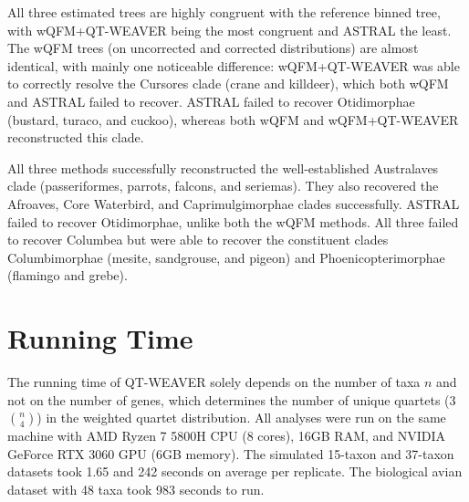 \documentclass[runningheads]{llncs}
\begin{document}

All three estimated trees are highly congruent with the reference binned tree, with wQFM+QT-WEAVER being the most congruent and ASTRAL the least. %
The wQFM trees (on uncorrected and corrected distributions) are almost identical, with mainly one noticeable difference: wQFM+QT-WEAVER was able to correctly resolve the Cursores clade (crane and killdeer), which both wQFM and ASTRAL failed to recover. ASTRAL failed to recover Otidimorphae (bustard, turaco, and cuckoo), whereas both wQFM and wQFM+QT-WEAVER reconstructed this clade.

All three methods successfully reconstructed the well-established Australaves clade (passeriformes, parrots, falcons, and seriemas). They also recovered the Afroaves, Core Waterbird, and Caprimulgimorphae clades successfully.
ASTRAL failed to recover Otidimorphae, unlike both the wQFM methods.  All three failed to recover Columbea but were able to recover the constituent clades Columbimorphae (mesite, sandgrouse, and pigeon) and Phoenicopterimorphae (flamingo and grebe).

\vspace{-10pt}
\section{Running Time}
The running time of QT-WEAVER solely depends on the number of taxa $n$ and not on the number of genes, which determines the number of unique quartets ($3$$n \choose 4$) in the weighted quartet distribution.
All analyses were run on the same machine with AMD Ryzen 7 5800H CPU (8 cores), 16GB RAM, and NVIDIA GeForce RTX 3060 GPU (6GB memory). The simulated 15-taxon and 37-taxon datasets took 1.65 and 242 seconds on average per replicate. The biological avian dataset with 48 taxa took 983 seconds to run.
\end{document}
